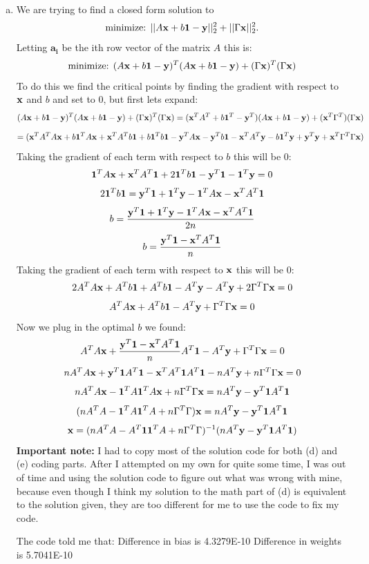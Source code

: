\documentclass[12pt,letterpaper]{hmcpset}
\begin{document}
\begin{solution}
	\begin{enumerate}[(d)]
	    \item We are trying to find a closed form solution to 
    	\[
        \text{minimize: } ||A{\bf x} + b{\bf 1} - {\bf y}||_2^2 + ||\Gamma{\bf x}||_2^2.
	    \]
	    Letting $\mathbf{a_i}$ be the ith row vector of the matrix $A$ this is:
	    \[
	    \text{minimize: } (A{\bf x} + b{\bf 1} - {\bf y})^T(A{\bf x} + b{\bf 1} - {\bf y}) + (\Gamma{\bf x})^T(\Gamma{\bf x})
	    \]
	    To do this we find the critical points by finding the gradient with respect to ${\bf x}$ and $b$ and set to 0, but first lets expand:
	    \[
	    (A{\bf x} + b{\bf 1} - {\bf y})^T(A{\bf x} + b{\bf 1} - {\bf y}) + (\Gamma{\bf x})^T(\Gamma{\bf x}) = ({\bf x}^TA^T + b{\bf 1}^T - {\bf y}^T)(A{\bf x} + b{\bf 1} - {\bf y}) + ({\bf x}^T\Gamma^T)(\Gamma{\bf x})
	    \]
	    \[
	    = ({\bf x}^TA^TA{\bf x} + b{\bf 1}^TA{\bf x} + {\bf x}^TA^Tb{\bf 1} + b{\bf 1}^Tb{\bf 1} - {\bf y}^TA{\bf x} - {\bf y}^Tb{\bf 1} - {\bf x}^TA^T{\bf y} - b{\bf 1}^T{\bf y} + {\bf y}^T{\bf y} +  {\bf x}^T\Gamma^T\Gamma{\bf x})
	    \]
	    Taking the gradient of each term with respect to $b$ this will be 0:
	    \[
	    {\bf 1}^TA{\bf x} + {\bf x}^TA^T{\bf 1} + 2{\bf 1}^Tb{\bf 1} - {\bf y}^T{\bf 1} - {\bf 1}^T{\bf y} = 0
	    \]
	    \[
	    2{\bf 1}^Tb{\bf 1} = {\bf y}^T{\bf 1} + {\bf 1}^T{\bf y} - {\bf 1}^TA{\bf x} - {\bf x}^TA^T{\bf 1}
	    \]
	    \[
	    b = \frac{{\bf y}^T{\bf 1} + {\bf 1}^T{\bf y} - {\bf 1}^TA{\bf x} - {\bf x}^TA^T{\bf 1}}{2n}
	    \]
	    \[
	    b = \frac{{\bf y}^T{\bf 1} - {\bf x}^TA^T{\bf 1}}{n}
	    \]
	    Taking the gradient of each term with respect to ${\bf x}$ this will be 0:
	    \[
	    2A^TA{\bf x} + A^Tb{\bf 1} + A^Tb{\bf 1} - A^T{\bf y} - A^T{\bf y} + 2\Gamma^T\Gamma{\bf x} = 0
	    \]
	    \[
	    A^TA{\bf x} + A^Tb{\bf 1} - A^T{\bf y} + \Gamma^T\Gamma{\bf x} = 0
	    \]
	    Now we plug in the optimal $b$ we found:
	    \[
	    A^TA{\bf x} + \frac{{\bf y}^T{\bf 1} - {\bf x}^TA^T{\bf 1}}{n}A^T{\bf 1} - A^T{\bf y} + \Gamma^T\Gamma{\bf x} = 0
	    \]
	    \[
	    nA^TA{\bf x} + {\bf y}^T{\bf 1}A^T{\bf 1} - {\bf x}^TA^T{\bf 1}A^T{\bf 1} - nA^T{\bf y} + n\Gamma^T\Gamma{\bf x} = 0
	    \]
	    \[
	    nA^TA{\bf x} - {\bf 1}^TA{\bf 1}^TA{\bf x} + n\Gamma^T\Gamma{\bf x} = nA^T{\bf y} - {\bf y}^T{\bf 1}A^T{\bf 1}
	    \]
	    \[
	    (nA^TA - {\bf 1}^TA{\bf 1}^TA + n\Gamma^T\Gamma){\bf x} = nA^T{\bf y} - {\bf y}^T{\bf 1}A^T{\bf 1}
	    \]
	    \[
	    {\bf x} = (nA^TA - A^T{\bf 1}{\bf 1}^TA + n\Gamma^T\Gamma)^{-1}(nA^T{\bf y} - {\bf y}^T{\bf 1}A^T{\bf 1})
	    \]
	    \textbf{Important note:} I had to copy most of the solution code for both (d) and (e) coding parts. After I attempted on my own for quite some time, I was out of time and using the solution code to figure out what was wrong with mine, because even though I think my solution to the math part of (d) is equivalent to the solution given, they are too different for me to use the code to fix my code.
	    
	    The code told me that:\newline
	    Difference in bias is  4.3279E-10\newline
        Difference in weights is  5.7041E-10
        

\end{enumerate}
\end{solution}
\end{document}
